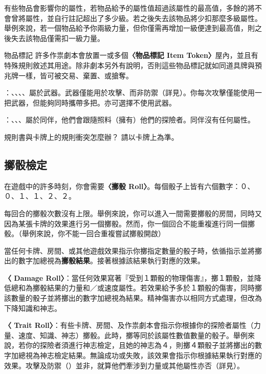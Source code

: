 有些物品會影響你的屬性，若物品給予的屬性值超過該屬性的最高值，多餘的將不會曾將屬性，並自行註記超出了多少級。若之後失去該物品將少扣那麼多級屬性。舉例來說，若一個物品給予你兩級力量，但你僅需再增加一級便達到最高值，則之後失去該物品僅需扣一級力量。

\begin{RuleBox}{物品標記}
許多作祟劇本會放置一或多個\textbf{〈物品標記 Item Token〉}屋內，並且有特殊規則敘述其用途。除非劇本另外有說明，否則這些物品標記就如同道具牌與預兆牌一樣，皆可被交易、棄置、或搶奪。
\end{RuleBox}

\textbf{}：、、、、屬於武器。武器僅能用於攻擊、而非防禦（詳見）。你每次攻擊僅能使用一把武器，但能夠同時攜帶多把。亦可選擇不使用武器。

\textbf{}：、、、屬於同伴，他們會跟隨照料（擁有）他們的探險者。同伴沒有任何屬性。

\begin{RuleBox}{規則書與卡牌上的規則衝突怎麼辦？}
  請以卡牌上為準。
\end{RuleBox}


\subsection{擲骰檢定} \label{ssec:attempt-a-die-roll}

在遊戲中的許多時刻，你會需要\textbf{〈擲骰 Roll〉}。每個骰子上皆有六個數字：０、０、１、１、２、２。

每回合的擲骰次數沒有上限。舉例來說，你可以進入一間需要擲骰的房間，同時又因為某張卡牌的效果進行另一個擲骰。然而，你一個回合不能重複進行同一個擲骰。（舉例來說，你不能一回合重複嘗試擲骰開啟）

當任何卡牌、房間、或其他遊戲效果指示你擲指定數量的骰子時，依循指示並將擲出的數字加總視為\textbf{擲骰結果}。接著根據該結果執行對應的效果。

\textbf{〈 Damage Roll〉}：當任何效果寫著『受到１顆骰的物理傷害』，擲１顆骰，並降低總和為擲骰結果的力量和／或速度屬性。若效果給予多於１顆骰的傷害，同時擲該數量的骰子並將擲出的數字加總視為結果。精神傷害亦以相同方式處理，但改為下降知識和神志。

\textbf{〈 Trait Roll〉}：有些卡牌、房間、及作祟劇本會指示你根據你的探險者屬性（力量、速度、知識、神志）擲骰。此時，擲等同於該屬性數值數量的骰子。舉例來說，若你的探險者須進行神志檢定，且她的神志為４，則擲４顆骰子並將擲出的數字加總視為神志檢定結果。無論成功或失敗，該效果會指示你根據結果執行對應的效果。攻擊及防禦（）並非，就算他們牽涉到力量或其他屬性亦否（詳見）。

